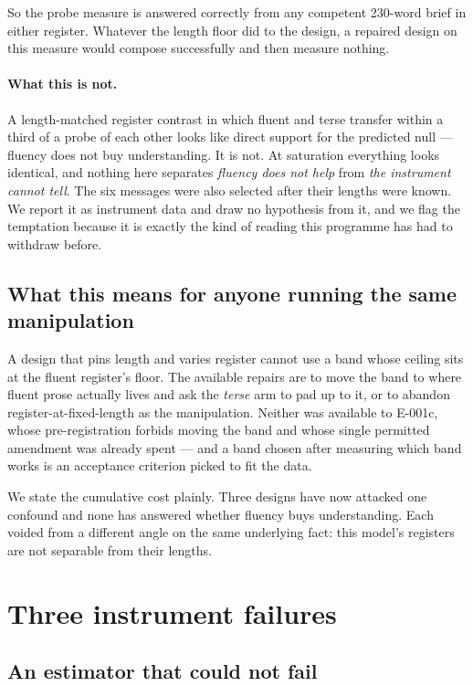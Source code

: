 \documentclass[11pt]{article}
\begin{document}
So the probe measure is answered correctly from any competent 230-word brief in
either register. Whatever the length floor did to the design, a repaired design
on this measure would compose successfully and then measure nothing.

\paragraph{What this is not.} A length-matched register contrast in which fluent
and terse transfer within a third of a probe of each other looks like direct
support for the predicted null --- fluency does not buy understanding. It is not.
At saturation everything looks identical, and nothing here separates \emph{fluency
does not help} from \emph{the instrument cannot tell}. The six messages were also
selected after their lengths were known. We report it as instrument data and
draw no hypothesis from it, and we flag the temptation because it is exactly the
kind of reading this programme has had to withdraw before.

\subsection{What this means for anyone running the same manipulation}

A design that pins length and varies register cannot use a band whose ceiling
sits at the fluent register's floor. The available repairs are to move the band
to where fluent prose actually lives and ask the \emph{terse} arm to pad up to
it, or to abandon register-at-fixed-length as the manipulation. Neither was
available to E-001c, whose pre-registration forbids moving the band and whose
single permitted amendment was already spent --- and a band chosen after
measuring which band works is an acceptance criterion picked to fit the data.

We state the cumulative cost plainly. Three designs have now attacked one
confound and none has answered whether fluency buys understanding. Each voided
from a different angle on the same underlying fact: this model's registers are
not separable from their lengths.

\section{Three instrument failures}
\label{sec:instrument}

\subsection{An estimator that could not fail}
\end{document}

